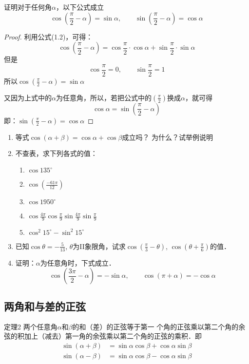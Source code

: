 \begin{example}
证明对于任何角$\alpha$，以下公式成立
\[\cos\left(\frac{\pi}{2}-\alpha\right)=\sin \alpha,\qquad \sin\left(\frac{\pi}{2}-\alpha\right)=\cos \alpha\]
\end{example}

\begin{proof}
利用公式(1.2)，可得：
\[\cos\left(\frac{\pi}{2}-\alpha\right)=\cos\frac{\pi}{2}\cdot \cos\alpha+\sin\frac{\pi}{2}\cdot \sin \alpha\]
但是
\[\cos\frac{\pi}{2}=0,\qquad \sin\frac{\pi}{2}=1\]
所以$\cos\left(\frac{\pi}{2}-\alpha\right)=\sin\alpha$

又因为上式中的$\alpha$为任意角，所以，若把公式中的$\left(\frac{\pi}{2}\right)$换成$\alpha$，就可得
\[\cos\alpha=\sin\left(\frac{\pi}{2}-\alpha\right)\]
即：$\sin\left(\frac{\pi}{2}-\alpha\right)=\cos\alpha$
\end{proof}

\begin{ex}
\begin{enumerate}
    \item 等式$\cos(\alpha+\beta)=\cos\alpha+\cos\beta$成立吗？
    为什么？试举例说明
    
    \item 不查表，求下列各式的值：
    \begin{multicols}{2}
    \begin{enumerate}
        \item $\cos135^{\circ}$
        \item $\cos\left(\frac{-61\pi}{12}\right)$
        \item $\cos1950^{\circ}$
        \item $\cos\frac{4\pi}{9} \cos\frac{\pi}{9}\sin\frac{4\pi}{9}\sin \frac{\pi}{9}$
        \item $\cos^2 15^{\circ}-\sin^2 15^{\circ}$
    \end{enumerate}        
    \end{multicols}

\item 已知$\cos\theta=-\frac{5}{13}$, $\theta$为II象限角，试求$\cos\left(\frac{\pi}{3}-\theta\right)$,
    $\cos\left(\theta+\frac{\pi}{6}\right)$的值．
    \item 证明：$\alpha$为任意角时，下式成立．
\[\cos\left(\frac{3\pi}{2}-\alpha\right)=-\sin\alpha,\qquad \cos(\pi+\alpha)=-\cos\alpha  \]
\end{enumerate}
\end{ex}


\subsection{两角和与差的正弦}
\begin{blk}{定理2}
两个任意角$\alpha$和$\beta$的和（差）的正弦等于第一
个角的正弦乘以第二个角的余弦的积加上（减去）第一角的余弦乘以第二个角的正弦的乘积．即
\begin{align}
    \sin (\alpha+\beta) &=\sin\alpha\cos\beta+\cos\alpha\sin\beta \\
    \sin (\alpha-\beta) &=\sin\alpha\cos\beta-\cos\alpha\sin\beta
\end{align}
\end{blk}

